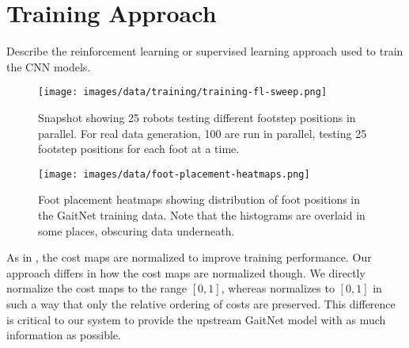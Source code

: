 \section{Training Approach}

\begin{outline}
  Describe the reinforcement learning or supervised learning approach
  used to train the CNN models.
\end{outline}

\begin{figure}
  \centering
  \texttt{[image: images/data/training/training-fl-sweep.png]}
  \caption{Snapshot showing 25 robots testing different footstep
    positions in parallel. For real data generation, 100 are run in
  parallel, testing 25 footstep positions for each foot at a time.}
\end{figure}

\begin{figure}
  \centering
  \texttt{[image: images/data/foot-placement-heatmaps.png]}
  \caption{Foot placement heatmaps showing distribution of foot
    positions in the GaitNet training data. Note that the histograms
  are overlaid in some places, obscuring data underneath.}
  \label{fig:data-cn-training-process}
\end{figure}

As in \cite{bratta_contactnet_2024}, the cost maps are normalized to
improve training performance. Our approach differs in how the cost
maps are normalized though. We directly normalize the cost maps to
the range $[0, 1]$, whereas \cite{bratta_contactnet_2024} normalizes
to $[0,1]$ in such a way that only the relative ordering of costs are
preserved. This difference is critical to our system to provide the
upstream GaitNet model with as much information as possible.



